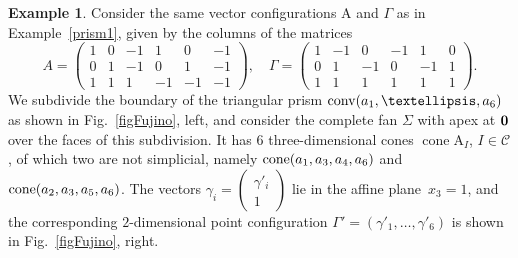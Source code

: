 \documentclass[a4paper]{amsart}
\theoremstyle{definition}
\newtheorem{example}[theorem]{Example}
\theoremstyle{remark}
\numberwithin{equation}{section}
\newcommand{\mb}[1]{{\textbf {\textit#1}}}
\def\cone{\mathop{\mathrm{cone}}}
\def\conv{\mathop{\mathrm{conv}}}
\newcommand{\<}{\langle}
\renewcommand{\>}{\rangle}
\begin{document}
\begin{example}
Consider the same vector configurations $\mathrm A$ and $\Gamma$ as in Example~\ref{prism1}, given by the columns of the matrices
\[
  A=\begin{pmatrix}1&0&-1&1&0&-1\\0&1&-1&0&1&-1\\
  1&1&1&-1&-1&-1\end{pmatrix},\quad
    \varGamma=\begin{pmatrix}1&-1&0&-1&1&0\\0&1&-1&0&-1&1\\
  1&1&1&1&1&1\end{pmatrix}.
\]   
We subdivide the boundary of the triangular prism $\conv(\mb a_1,\ldots,\mb a_6)$
as shown in Fig.~\ref{figFujino}, left, and consider the complete fan 
$\Sigma$ with apex at $\bf 0$ over the faces of this subdivision. It has $6$ three-dimensional cones $\cone\mathrm A_I$, $I\in\mathcal C$, of which two are not simplicial, namely $\cone(\mb a_1,\mb a_3,\mb a_4,\mb a_6)$ and $\cone(\mb a_2,\mb a_3,\mb a_5,\mb a_6)$. The vectors
$\gamma_i=\begin{pmatrix}\gamma'_i\\1\end{pmatrix}$ lie in the affine plane~$x_3=1$, and the corresponding $2$-dimensional point configuration 
$\Gamma'=(\gamma'_1,\ldots,\gamma'_6)$ is shown in Fig.~\ref{figFujino}, right.


\end{example}
\end{document}
